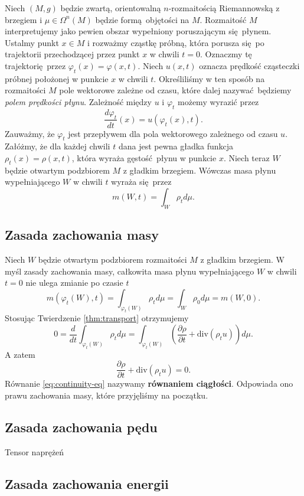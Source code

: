 Niech \((M, g)\) będzie zwartą, orientowalną \(n\)-rozmaitością Riemannowską z brzegiem i \(\mu \in \Omega^n(M)\) będzie formą objętości na \(M\). Rozmaitość \(M\) interpretujemy jako pewien obszar wypełniony poruszającym się płynem. Ustalmy punkt \(x\in M\) i rozważmy cząstkę próbną, która porusza się po trajektorii przechodzącej przez punkt \(x\) w chwili \(t=0\). Oznaczmy tę trajektorię przez \(\varphi_t(x)=\varphi(x,t)\). Niech \(u(x, t)\) oznacza prędkość cząsteczki próbnej położonej w punkcie \(x\) w chwili \(t\). Określiliśmy w ten sposób na rozmaitości \(M\) pole wektorowe zależne od czasu, które dalej nazywać będziemy \emph{polem prędkości płynu}. Zależność między \(u\) i \(\varphi_t\) możemy wyrazić przez
\begin{equation}\label{eq:first-step}
    \frac{d\varphi_t}{dt}(x) = u(\varphi_t(x), t). 
\end{equation}
Zauważmy, że \(\varphi_t\) jest przepływem dla pola wektorowego zależnego od czasu \(u\). Załóżmy, że dla każdej chwili \(t\) dana jest pewna gładka funkcja \(\rho_t(x)=\rho(x,t)\), która wyraża gęstość płynu w punkcie \(x\). Niech teraz \(W\) będzie otwartym podzbiorem \(M\) z gładkim brzegiem. Wówczas masa płynu wypełniającego \(W\) w chwili \(t\) wyraża się przez
\begin{equation}\label{eq:mass}
    m(W,t) = \int_W \rho_t d\mu.
\end{equation}

\subsection{Zasada zachowania masy} Niech \(W\) będzie otwartym podzbiorem rozmaitości \(M\) z gładkim brzegiem. W myśl zasady zachowania masy, całkowita masa płynu wypełniającego \(W\) w chwili \(t=0\) nie ulega zmianie po czasie \(t\)
\begin{equation}\label{eq:mass-cons-1}
    m\left(\varphi_t(W), t\right) = \int_{\varphi_t(W)}\rho_t d\mu = \int_W \rho_0 d\mu = m(W, 0).
\end{equation}
Stosując Twierdzenie \ref{thm:transport} otrzymujemy
\begin{equation*}
    0 = \frac{d}{dt}\int_{\varphi_t(W)} \rho_t d\mu = \int_{\varphi_t(W)}\left(\frac{\partial \rho}{\partial t} + \mathrm{div}(\rho_t u) \right) d\mu.
\end{equation*}
A zatem
\begin{equation}\label{eq:continuity-eq}
\frac{\partial \rho}{\partial t} + \mathrm{div}(\rho_t u) = 0. 
\end{equation}
Równanie \eqref{eq:continuity-eq} nazywamy \textbf{równaniem ciągłości}. Odpowiada ono prawu zachowania masy, które przyjęliśmy na początku.
\subsection{Zasada zachowania pędu}
Tensor naprężeń
\subsection{Zasada zachowania energii}

